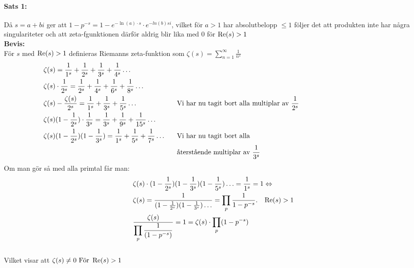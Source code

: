 \documentclass[a4paper,twoside]{article}%
\begin{document}
\paragraph{Sats 1:}
Då $s = a+ bi$ ger att $1-p^{-s} = 1 - e^{-\ln(a) \cdot s} \cdot e^{-ln(b)si}$, vilket för $a > 1$ har
absolutbelopp $\leq 1$ följer det att produkten inte har några singulariteter och att zeta-fgunktionen
därför aldrig blir lika med 0 för $\operatorname{Re}(s) > 1$
\\
{\bf Bevis:} \\
För $s$ med $\operatorname{Re}(s) > 1$ definieras Riemanns zeta-funktion som 
$\zeta(s) = \sum\limits_{n = 1}^\infty \frac {1} {n^s}$ 
\begin{equation}
	\begin{aligned}
		&\zeta(s) = \frac 1 {1^s} + \frac 1 {2^s} + \frac 1 {3^s} + \frac 1 {4^s} \ldots \notag\\
		&\zeta(s) \cdot \frac 1 {2^s} = \frac 1 {2^s} + \frac 1 {4^s} + \frac 1 {6^s} + \frac 1 {8^s} \ldots \\
		&\zeta(s) - \frac {\zeta(s)} {2^s} = \frac 1 {1^s} + \frac 1 {3^s} + \frac 1 {5^s} \ldots &
		\hspace{\width} &\text{Vi har nu tagit bort alla multiplar av } \frac 1 {2^s} \\
		&\zeta(s) (1 - \frac 1 {2^s}) \cdot \frac 1 {3^s} = \frac 1 {3^s} + \frac 1 {9^s} + \frac 1 {15^s} \ldots\\
		&\zeta(s)(1 - \frac 1 {2^s})(1 - \frac 1 {3^s}) = \frac 1 {1^s} + \frac 1 {5^s} + \frac 1 {7^s} \ldots &
		\hspace{\width} &\text{Vi har nu tagit bort alla} \\
		& & \hspace{\width} &\text{återstående multiplar av } \frac 1 {3^s} \\
	\end{aligned}
	\phantom{\hspace{4cm}}
\end{equation}
Om man gör så med alla primtal får man: 
\begin{equation}
	\begin{aligned}
		\notag
		&\zeta(s) \cdot (1 - \frac 1 {2^s})(1 - \frac 1 {3^s})(1 - \frac 1 {5^s}) \ldots = \frac 1 {1^s} = 1 \Leftrightarrow \\  
		&\zeta(s)  = \frac 1 {(1 - \frac 1 {2^s})(1 - \frac 1 {3^s})\ldots} = \prod_p \frac 1 {1 - p^{-s}}.\hspace{3mm} \operatorname{Re}(s) > 1 \\
		&\frac {\zeta(s)} {\displaystyle\prod_p \frac 1 {(1 - p^{-s})}} = 1 = \zeta(s) \cdot \prod_p (1 - p^{-s}) \\
	\end{aligned}
\end{equation}
\\
Vilket visar att $\zeta(s) \ne 0 \text{ För } \operatorname{Re}(s) > 1$
\end{document}
